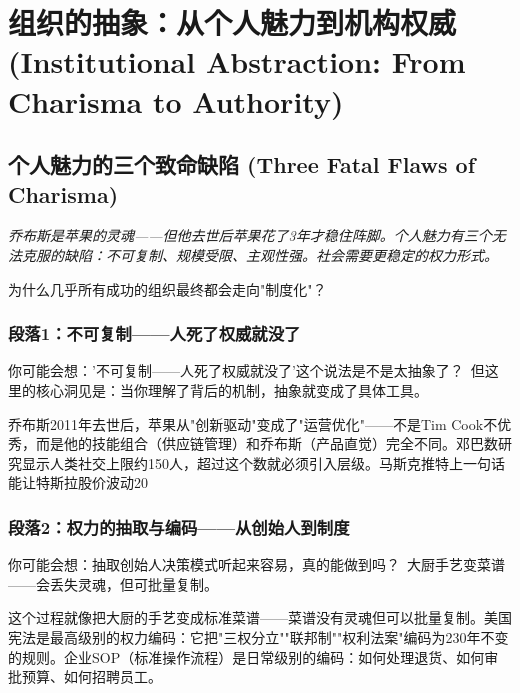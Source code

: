 \documentclass[a4paper,12pt]{book}
\newenvironment{motivation}{\begin{tcolorbox}[colback=gray!10,colframe=gray!60,title=\textit{本章动机},fonttitle=\bfseries,arc=0mm,leftrule=3mm]\small\itshape}{\end{tcolorbox}}
\newenvironment{questionbox}{\begin{tcolorbox}[colback=red!3!white,colframe=red!60!black]}{\end{tcolorbox}}
\begin{document}
\begin{motivation}
\begin{motivation}
\begin{motivation}
	\section{组织的抽象：从个人魅力到机构权威 (Institutional Abstraction: From Charisma to Authority)}

	\subsection{个人魅力的三个致命缺陷 (Three Fatal Flaws of Charisma)}
	\begin{motivation}
		乔布斯是苹果的灵魂——但他去世后苹果花了3年才稳住阵脚。个人魅力有三个无法克服的缺陷：不可复制、规模受限、主观性强。社会需要更稳定的权力形式。
	\end{motivation}
	\begin{questionbox}
		为什么几乎所有成功的组织最终都会走向"制度化"？
	\end{questionbox}

	\subsubsection*{段落1：不可复制——人死了权威就没了}

	\begin{tcolorbox}[colback=yellow!5, title=\textit{读者行为预测}]
		你可能会想：'不可复制——人死了权威就没了'这个说法是不是太抽象了？\ 但这里的核心洞见是：当你理解了背后的机制，抽象就变成了具体工具。
	\end{tcolorbox}

乔布斯2011年去世后，苹果从"创新驱动"变成了"运营优化"——不是Tim Cook不优秀，而是他的技能组合（供应链管理）和乔布斯（产品直觉）完全不同。邓巴数研究显示人类社交上限约150人，超过这个数就必须引入层级。马斯克推特上一句话能让特斯拉股价波动20%

	\subsubsection*{段落2：权力的抽取与编码——从创始人到制度}

	\begin{tcolorbox}[colback=yellow!5, title=\textit{读者行为预测}]
		你可能会想：抽取创始人决策模式听起来容易，真的能做到吗？\ 大厨手艺变菜谱——会丢失灵魂，但可批量复制。
	\end{tcolorbox}

这个过程就像把大厨的手艺变成标准菜谱——菜谱没有灵魂但可以批量复制。美国宪法是最高级别的权力编码：它把"三权分立""联邦制""权利法案"编码为230年不变的规则。企业SOP（标准操作流程）是日常级别的编码：如何处理退货、如何审批预算、如何招聘员工。


\end{motivation}
\end{motivation}
\end{motivation}
\end{document}
